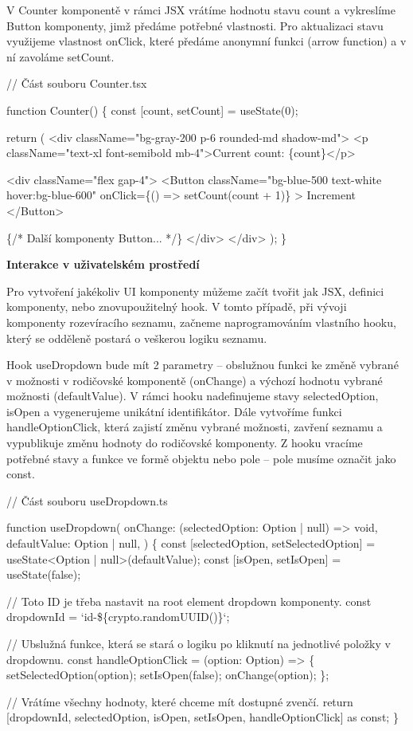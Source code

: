 V Counter komponentě v rámci JSX vrátíme hodnotu stavu count a vykreslíme Button komponenty, jimž předáme potřebné vlastnosti. 
Pro aktualizaci stavu využijeme vlastnost onClick, které předáme anonymní funkci (arrow function) a v ní zavoláme setCount.

\begin{prog}
// Část souboru Counter.tsx

function Counter() \{
  const [count, setCount] = useState(0);

  return (
    <div className="bg-gray-200 p-6 rounded-md shadow-md">
      <p className="text-xl font-semibold mb-4">Current count: \{count\}</p>

      <div className="flex gap-4">
        <Button
          className="bg-blue-500 text-white hover:bg-blue-600"
          onClick=\{() => setCount(count + 1)\}
        >
          Increment
        </Button>

        \{/* Další komponenty Button... */\}
      </div>
    </div>
  );
\}
\end{prog}

\begin{flushleft}
  \textbf{Interakce v uživatelském prostředí}
\end{flushleft}

Pro vytvoření jakékoliv UI komponenty můžeme začít tvořit jak JSX, definici komponenty, nebo znovupoužitelný hook. 
V tomto případě, při vývoji komponenty rozevíracího seznamu, začneme naprogramováním vlastního hooku, který se odděleně postará o veškerou logiku seznamu.

Hook useDropdown bude mít 2 parametry -- obslužnou funkci ke změně vybrané v možnosti v rodičovské komponentě (onChange) a výchozí hodnotu vybrané možnosti (defaultValue). 
V rámci hooku nadefinujeme stavy selectedOption, isOpen a vygenerujeme unikátní identifikátor. 
Dále vytvoříme funkci handleOptionClick, která zajistí změnu vybrané možnosti, zavření seznamu a vypublikuje změnu hodnoty do rodičovské komponenty. 
Z hooku vracíme potřebné stavy a funkce ve formě objektu nebo pole -- pole musíme označit jako const.

\begin{prog}
// Část souboru useDropdown.ts

function useDropdown(
  onChange: (selectedOption: Option | null) => void,
  defaultValue: Option | null,
) \{
  const [selectedOption, setSelectedOption] 
    = useState<Option | null>(defaultValue);
  const [isOpen, setIsOpen] = useState(false);

  // Toto ID je třeba nastavit na root element dropdown komponenty.
  const dropdownId = `id-\$\{crypto.randomUUID()\}`;

  // Ubslužná funkce, která se stará o logiku
    po kliknutí na jednotlivé položky v dropdownu.
  const handleOptionClick = (option: Option) => \{
    setSelectedOption(option);
    setIsOpen(false);
    onChange(option);
  \};

  // Vrátíme všechny hodnoty, které chceme mít dostupné zvenčí.
  return [dropdownId, selectedOption, 
    isOpen, setIsOpen, handleOptionClick] as const;
\}
\end{prog}

